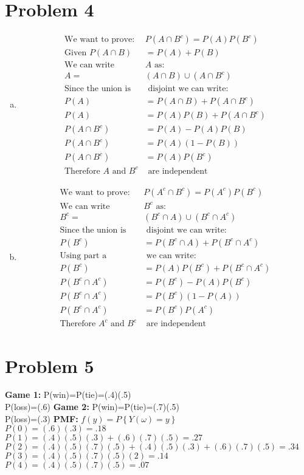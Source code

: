 \documentclass{article}
\begin{document}
\begin{flushleft}
\section*{Problem 4}
\begin{enumerate}[(a)]
\item
\begin{align*}
\text{We want to prove: } &P(A\cap B^c)=P(A)P(B^c)\\
\text{Given } P(A\cap B)&=P(A)+P(B)\\
\text{We can write } &A \text{ as:}\\
A=&(A\cap B)\cup (A\cap B^c)\\
\text{Since the union is}&\text{ disjoint we can write:}\\
P(A)&=P(A\cap B)+P(A\cap B^c)\\
P(A)&=P(A)P(B)+P(A\cap B^c)\\
P(A\cap B^c)&=P(A)-P(A)P(B)\\
P(A\cap B^c)&=P(A)(1-P(B))\\
P(A\cap B^c)&=P(A)P(B^c)\\
\text{Therefore } A \text{ and } B^c & \text{ are independent}
\end{align*}
\item
\begin{align*}
\text{We want to prove: }& P(A^c\cap B^c)=P(A^c)P(B^c)\\
\text{We can write } &B^c \text{ as:}\\
B^c=&(B^c\cap A)\cup (B^c\cap A^c)\\
\text{Since the union is}&\text{ disjoint we can write:}\\
P(B^c)&=P(B^c\cap A)+P(B^c\cap A^c)\\
\text{Using part a}&\text{ we can write:}\\
P(B^c)&=P(A)P(B^c)+P(B^c\cap A^c)\\
P(B^c\cap A^c)&=P(B^c)-P(A)P(B^c)\\
P(B^c\cap A^c)&=P(B^c)(1-P(A))\\
P(B^c\cap A^c)&=P(B^c)P(A^c)\\
\text{Therefore } A^c \text{ and } B^c & \text{ are independent}
\end{align*}
\end{enumerate}
\section*{Problem 5}
\textbf{Game 1:} P(win)=P(tie)=(.4)(.5)\\
P(loss)=(.6)\medbreak
\textbf{Game 2:} P(win)=P(tie)=(.7)(.5)\\
P(loss)=(.3)\medbreak
\textbf{PMF:} $f(y)=P\left\{Y(\omega)=y\right\}$\\
$P(0)=(.6)(.3)=.18$\\
$P(1)=(.4)(.5)(.3)+(.6)(.7)(.5)=.27$\\
$P(2)=(.4)(.5)(.7)(.5)+(.4)(.5)(.3)+(.6)(.7)(.5)=.34$\\
$P(3)=(.4)(.5)(.7)(.5)(2)=.14$\\
$P(4)=(.4)(.5)(.7)(.5)=.07$
\pagebreak

\end{flushleft}
\end{document}
